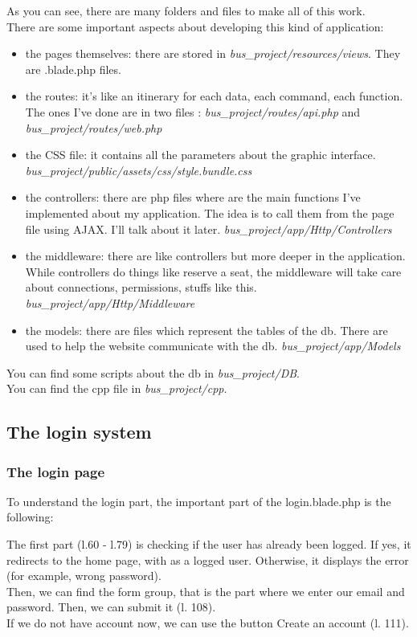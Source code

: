 \documentclass[12pt,a4paper,openany]{book}
\begin{document}
\begin{minipage}{0.8\linewidth}
	As you can see, there are many folders and files to make all of this work.\\
	
	There are some important aspects about developing this kind of application:
	\begin{itemize}
		\item the pages themselves: there are stored in \emph{bus\_project/resources/views}. They are .blade.php files.
		\item the routes: it's like an itinerary for each data, each command, each function. The ones I've done are in two files : \emph{bus\_project/routes/api.php} and \emph{bus\_project/routes/web.php}
		\item the CSS file: it contains all the parameters about the graphic interface. \emph{bus\_project/public/assets/css/style.bundle.css}
		\item the controllers: there are php files where are the main functions I've implemented about my application. The idea is to call them from the page file using AJAX. I'll talk about it later. \emph{bus\_project/app/Http/Controllers}
		\item the middleware: there are like controllers but more deeper in the application. While controllers do things like reserve a seat, the middleware will take care about connections, permissions, stuffs like this. \emph{bus\_project/app/Http/Middleware}
		\item the models: there are files which represent the tables of the db. There are used to help the website communicate with the db. \emph{bus\_project/app/Models}
	\end{itemize}
	\begin{remarque}
		You can find some scripts about the db in \emph{bus\_project/DB}.\\
		You can find the cpp file in \emph{bus\_project/cpp}.
	\end{remarque}
\end{minipage}

\subsection{The login system}
\subsubsection{The login page}
To understand the login part, the important part of the login.blade.php is the following:

\bigskip
The first part (l.60 - l.79) is checking if the user has already been logged. If yes, it redirects to the home page, with as a logged user. Otherwise, it displays the error (for example, wrong password).\\
Then, we can find the form group, that is the part where we enter our email and password. Then, we can submit it (l. 108).\\
If we do not have account now, we can use the button Create an account (l. 111).
\end{document}
